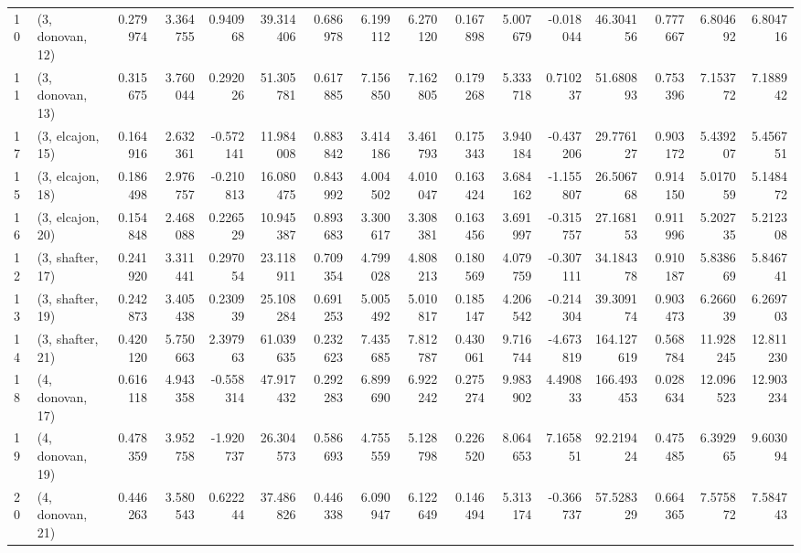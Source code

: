 \begin{tabular}{llrrrrrrrrrrrrrr}
10 &  (3, donovan, 12) &   0.279974 &  3.364755 &  0.940968 &  39.314406 &  0.686978 &   6.199112 &  6.270120 &  0.167898 &   5.007679 & -0.018044 &   46.304156 &  0.777667 &   6.804692 &   6.804716 \\
11 &  (3, donovan, 13) &   0.315675 &  3.760044 &  0.292026 &  51.305781 &  0.617885 &   7.156850 &  7.162805 &  0.179268 &   5.333718 &  0.710237 &   51.680893 &  0.753396 &   7.153772 &   7.188942 \\
17 &  (3, elcajon, 15) &   0.164916 &  2.632361 & -0.572141 &  11.984008 &  0.883842 &   3.414186 &  3.461793 &  0.175343 &   3.940184 & -0.437206 &   29.776127 &  0.903172 &   5.439207 &   5.456751 \\
15 &  (3, elcajon, 18) &   0.186498 &  2.976757 & -0.210813 &  16.080475 &  0.843992 &   4.004502 &  4.010047 &  0.163424 &   3.684162 & -1.155807 &   26.506768 &  0.914150 &   5.017059 &   5.148472 \\
16 &  (3, elcajon, 20) &   0.154848 &  2.468088 &  0.226529 &  10.945387 &  0.893683 &   3.300617 &  3.308381 &  0.163456 &   3.691997 & -0.315757 &   27.168153 &  0.911996 &   5.202735 &   5.212308 \\
12 &  (3, shafter, 17) &   0.241920 &  3.311441 &  0.297054 &  23.118911 &  0.709354 &   4.799028 &  4.808213 &  0.180569 &   4.079759 & -0.307111 &   34.184378 &  0.910187 &   5.838669 &   5.846741 \\
13 &  (3, shafter, 19) &   0.242873 &  3.405438 &  0.230939 &  25.108284 &  0.691253 &   5.005492 &  5.010817 &  0.185147 &   4.206542 & -0.214304 &   39.309174 &  0.903473 &   6.266039 &   6.269703 \\
14 &  (3, shafter, 21) &   0.420120 &  5.750663 &  2.397963 &  61.039635 &  0.232623 &   7.435685 &  7.812787 &  0.430061 &   9.716744 & -4.673819 &  164.127619 &  0.568784 &  11.928245 &  12.811230 \\
18 &  (4, donovan, 17) &   0.616118 &  4.943358 & -0.558314 &  47.917432 &  0.292283 &   6.899690 &  6.922242 &  0.275274 &   9.983902 &  4.490833 &  166.493453 &  0.028634 &  12.096523 &  12.903234 \\
19 &  (4, donovan, 19) &   0.478359 &  3.952758 & -1.920737 &  26.304573 &  0.586693 &   4.755559 &  5.128798 &  0.226520 &   8.064653 &  7.165851 &   92.219424 &  0.475485 &   6.392965 &   9.603094 \\
20 &  (4, donovan, 21) &   0.446263 &  3.580543 &  0.622244 &  37.486826 &  0.446338 &   6.090947 &  6.122649 &  0.146494 &   5.313174 & -0.366737 &   57.528329 &  0.664365 &   7.575872 &   7.584743 \\

\end{tabular}
